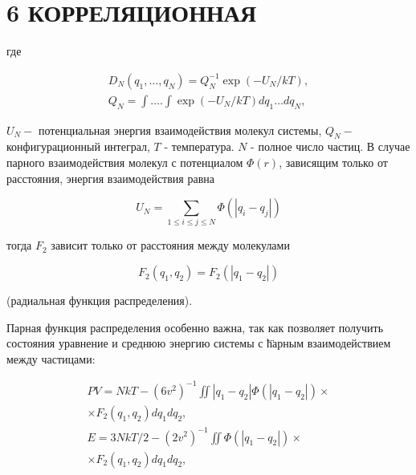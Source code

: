 \documentclass[10pt]{article}
\begin{document}
\section{6 КОРРЕЛЯЦИОННАЯ}

где



\[

\begin{gathered}

D_{N}\left(q_{1}, \ldots, q_{N}\right)=Q_{N}^{-1} \exp \left(-U_{N} / k T\right), \\

Q_{N}=\int \ldots . \int \exp \left(-U_{N} / k T\right) d q_{1} \ldots d q_{N},

\end{gathered}

\]



$U_{N}-$ потенциальная энергия взаимодействия молекул системы, $Q_{N}-$ конфигурационный интеграл, $T$ - температура. $N$ - полное число частиц. В случае парного взаимодействия молекул с потенциалом $\Phi(r)$, зависящим только от расстояния, энергия взаимодействия равна



\[

U_{N}=\sum_{1 \leqslant i \leqslant j \leqslant N} \Phi\left(\left|q_{i}-q_{j}\right|\right)

\]



тогда $F_{2}$ зависит только от расстояния между молекулами



\[

F_{2}\left(q_{1}, q_{2}\right)=F_{2}\left(\left|q_{1}-q_{2}\right|\right)

\]



(радиальная функция распределения).



Парная функция распределения особенно важна, так как позволяет получить состояния уравнение и среднюю энергию системы с ћ̈арным взаимодействием между частицами:



\[

\begin{gathered}

P V=N k T-\left(6 v^{2}\right)^{-1} \iint\left|q_{1}-q_{2}\right| \Phi\left(\left|q_{1}-q_{2}\right|\right) \times \\

\times F_{2}\left(q_{1}, q_{2}\right) d q_{1} d q_{2}, \\

E=3 N k T / 2-\left(2 v^{2}\right)^{-1} \iint \Phi\left(\left|q_{1}-q_{2}\right|\right) \times \\

\times F_{2}\left(q_{1}, q_{2}\right) d q_{1} d q_{2},

\end{gathered}

\]
\end{document}
